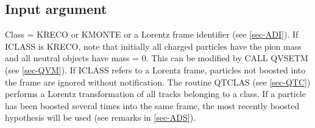 \subsection{\label{sec-QJI}Input argument}
\par
\begin{indentlist}{ 2.50cm}{ 2.75cm}
Class = KRECO or KMONTE or a Lorentz frame identifier (see
\ref{sec-ADI}).
If ICLASS is KRECO, note that initially all charged particles
have the pion mass and all neutral objects have mass = 0. This can
be modified by CALL QVSETM (see \ref{sec-QVM}).
If ICLASS refers to a Lorentz frame,
particles not boosted into the frame are ignored without
notification. The routine QTCLAS (see \ref{sec-QTC}) performs a Lorentz
transformation of all tracks belonging to a class. If a particle
has been boosted several times into the same frame, the most
recently boosted hypothesis will be used (see remarks in
\ref{sec-ADS}).
\end{indentlist}
 
